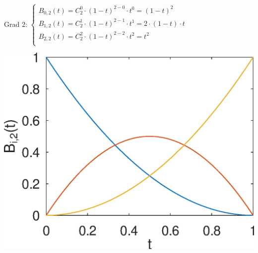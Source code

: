 \documentclass{article}
\begin{document}
\begin{minipage}[b]{0.5\textwidth}
    Grad $2$:
    $\begin{cases}
      B_{0,2}(t) = C_2^0 \cdot (1-t)^{2-0} \cdot t^0 = (1-t)^2\\
      B_{1,2}(t) = C_2^1 \cdot (1-t)^{2-1} \cdot t^1 = 2 \cdot (1-t) \cdot t\\
      B_{2,2}(t) = C_2^2 \cdot (1-t)^{2-2} \cdot t^2 = t^2\\
    \end{cases}$
    \begin{center}
        \includegraphics[scale=0.5]{bernstein_2}
    \end{center}
\end{minipage}
\end{document}
